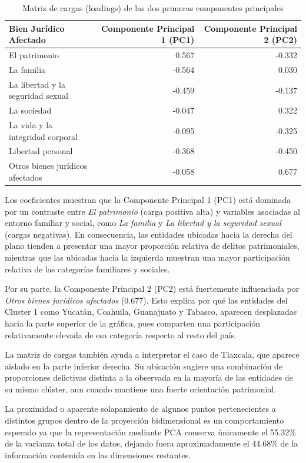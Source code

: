 \begin{table}[ht]
\centering
\caption{Matriz de cargas (loadings) de las dos primeras componentes principales}
\begin{tabular}{l r r}
\hline
\textbf{Bien Jurídico Afectado} & \textbf{Componente Principal 1 (PC1)} & \textbf{Componente Principal 2 (PC2)} \\
\hline
El patrimonio & 0.567 & -0.332 \\
La familia & -0.564 & 0.030 \\
La libertad y la seguridad sexual & -0.459 & -0.137 \\
La sociedad & -0.047 & 0.322 \\
La vida y la integridad corporal & -0.095 & -0.325 \\
Libertad personal & -0.368 & -0.450 \\
Otros bienes jurídicos afectados & -0.058 & 0.677 \\
\hline
\end{tabular}
\label{tab:pca-loadings}
\end{table}

Los coeficientes muestran que la Componente Principal 1 (PC1) está dominada por un contraste entre \emph{El patrimonio}
(carga positiva alta) y variables asociadas al entorno familiar y social, como \emph{La familia} y \emph{La libertad y la seguridad
sexual} (cargas negativas). En consecuencia, las entidades ubicadas hacia la derecha del plano tienden a presentar una
mayor proporción relativa de delitos patrimoniales, mientras que las ubicadas hacia la izquierda muestran una mayor
participación relativa de las categorías familiares y sociales.

Por su parte, la Componente Principal 2 (PC2) está fuertemente influenciada por \emph{Otros bienes jurídicos afectados} (0.677).
Esto explica por qué las entidades del Cluster 1 como Yucatán, Coahuila, Guanajuato y Tabasco, aparecen desplazadas hacia
la parte superior de la gráfica, pues comparten una participación relativamente elevada de esa categoría respecto al resto
del país.

La matriz de cargas también ayuda a interpretar el caso de Tlaxcala, que aparece aislado en la parte inferior derecha.
Su ubicación sugiere una combinación de proporciones delictivas distinta a la observada en la mayoría de las entidades de
su mismo clúster, aun cuando mantiene una fuerte orientación patrimonial.

La proximidad o aparente solapamiento de algunos puntos pertenecientes a distintos grupos dentro de la proyección bidimensional
es un comportamiento esperado ya que la representación mediante PCA conserva únicamente el 55.32\% de la varianza total de los
datos, dejando fuera aproximadamente el 44.68\% de la información contenida en las dimensiones restantes.

